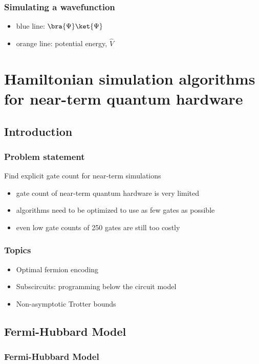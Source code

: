 \documentclass[10pt,a4paper]{beamer}
\begin{document}
\begin{frame}
  \frametitle{Simulating a wavefunction}
  \begin{itemize}
  	\item blue line:  $\bra{\Psi}\ket{\Psi}$ 
  	\item orange line: potential energy, $\hat{V}$
  \end{itemize}
\end{frame}




\section{Hamiltonian simulation algorithms for near-term quantum hardware}
\subsection{Introduction}
\begin{frame}
  \frametitle{Problem statement}
  \begin{Definition}
  Find explicit gate count for near-term simulations
  \end{Definition}
  \begin{itemize}
  	\item gate count of near-term quantum hardware is very limited
  	\item algorithms need to be optimized to use as few gates as possible
  	\item even low gate counts of 250 gates are still too costly
  \end{itemize}    
\end{frame}

\begin{frame}
\frametitle{Topics}
  \begin{itemize}
    \item Optimal fermion encoding 
  	\item Subscircuits: programming below the circuit model
  	\item Non-asymptotic Trotter bounds
  \end{itemize}    
\end{frame}

\subsection{Fermi-Hubbard Model}
\begin{frame}
 \frametitle{Fermi-Hubbard Model}
  
\end{frame}
\end{document}
